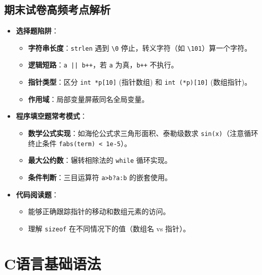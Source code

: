 \documentclass[a4paper,12pt]{article}
\begin{document}
\subsection{期末试卷高频考点解析}
\begin{itemize}
    \item \textbf{选择题陷阱}：
    \begin{itemize}
        \item \textbf{字符串长度}：\texttt{strlen} 遇到 \texttt{\textbackslash 0} 停止，转义字符（如 \texttt{\textbackslash 101}）算一个字符。
        \item \textbf{逻辑短路}：\texttt{a || b++}，若 \texttt{a} 为真，\texttt{b++} 不执行。
        \item \textbf{指针类型}：区分 \texttt{int *p[10]} (指针数组) 和 \texttt{int (*p)[10]} (数组指针)。
        \item \textbf{作用域}：局部变量屏蔽同名全局变量。
    \end{itemize}
    \item \textbf{程序填空题常考模式}：
    \begin{itemize}
        \item \textbf{数学公式实现}：如海伦公式求三角形面积、泰勒级数求 \texttt{sin(x)}（注意循环终止条件 \texttt{fabs(term) < 1e-5}）。
        \item \textbf{最大公约数}：辗转相除法的 \texttt{while} 循环实现。
        \item \textbf{条件判断}：三目运算符 \texttt{a>b?a:b} 的嵌套使用。
    \end{itemize}
    \item \textbf{代码阅读题}：
    \begin{itemize}
        \item 能够正确跟踪指针的移动和数组元素的访问。
        \item 理解 \texttt{sizeof} 在不同情况下的值（数组名 vs 指针）。
    \end{itemize}
\end{itemize}

\section{C语言基础语法}
\end{document}
